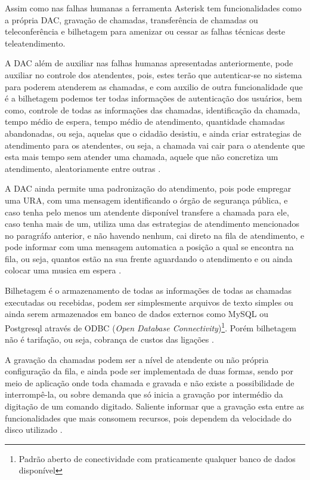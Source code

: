 Assim como nas falhas humanas a ferramenta Asterisk tem funcionalidades como a própria DAC, gravação de chamadas, transferência de chamadas ou teleconferência e bilhetagem para amenizar ou cessar as falhas técnicas deste teleatendimento.

A DAC além de auxiliar nas falhas humanas apresentadas anteriormente, pode auxiliar no controle dos atendentes, pois, estes terão que autenticar-se no sistema para poderem atenderem as chamadas, e com auxilio de outra funcionalidade que é a bilhetagem podemos ter todas informações de autenticação dos usuários, bem como, controle de todas as informações das chamadas, identificação da chamada, tempo médio de espera, tempo médio de atendimento, quantidade chamadas abandonadas, ou seja, aquelas que o cidadão desistiu, e ainda criar estrategias de atendimento para os atendentes, ou seja, a chamada vai cair para o atendente que esta mais tempo sem atender uma chamada, aquele que não concretiza um atendimento, aleatoriamente entre outras \cite{books/daglib/0018909}.

A DAC ainda permite uma padronização do atendimento, pois pode empregar uma URA, com uma mensagem identificando o órgão de segurança pública, e caso tenha pelo menos um atendente disponível transfere a chamada para ele, caso tenha mais de um, utiliza uma das estrategias de atendimento mencionados no paragráfo anterior, e não havendo nenhum, cai direto na fila de atendimento, e pode informar com uma mensagem automatica a posição a qual se encontra na fila, ou seja, quantos estão na sua frente aguardando o atendimento e ou ainda colocar uma musica em espera \cite{flavioeduardoandredade2005}.

Bilhetagem é o armazenamento de todas as informações de todas as chamadas executadas ou recebidas, podem ser simplesmente arquivos de texto simples ou ainda serem armazenados em banco de dados externos como MySQL ou Postgresql através de ODBC (\textit{Open Database Connectivity})\footnote{Padrão aberto de conectividade com praticamente qualquer banco de dados disponível}. Porém bilhetagem não é tarifação, ou seja, cobrança de custos das ligações \cite{alexandrekeller2014}.

A gravação da chamadas podem ser a nível de atendente ou não própria configuração da fila, e ainda pode ser implementada de duas formas, sendo por meio de aplicação onde toda chamada e gravada e não existe a possibilidade de interrompê-la, ou sobre demanda que só inicia a gravação por intermédio da digitação de um comando digitado. Saliente informar que a gravação esta entre as funcionalidades que mais consomem recursos, pois dependem da velocidade do disco utilizado \cite{alexandrekeller2014}.

